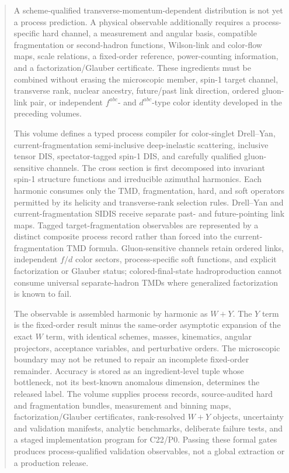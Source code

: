 \documentclass[11pt]{article}
\begin{document}
\begin{abstract}
A scheme-qualified transverse-momentum-dependent distribution is not yet a process prediction.  A physical observable additionally requires a process-specific hard channel, a measurement and angular basis, compatible fragmentation or second-hadron functions, Wilson-link and color-flow maps, scale relations, a fixed-order reference, power-counting information, and a factorization/Glauber certificate.  These ingredients must be combined without erasing the microscopic member, spin-1 target channel, transverse rank, nuclear ancestry, future/past link direction, ordered gluon-link pair, or independent \(f^{abc}\)- and \(d^{abc}\)-type color identity developed in the preceding volumes.

This volume defines a typed process compiler for color-singlet Drell--Yan, current-fragmentation semi-inclusive deep-inelastic scattering, inclusive tensor DIS, spectator-tagged spin-1 DIS, and carefully qualified gluon-sensitive channels.  The cross section is first decomposed into invariant spin-1 structure functions and irreducible azimuthal harmonics.  Each harmonic consumes only the TMD, fragmentation, hard, and soft operators permitted by its helicity and transverse-rank selection rules.  Drell--Yan and current-fragmentation SIDIS receive separate past- and future-pointing link maps.  Tagged target-fragmentation observables are represented by a distinct composite process record rather than forced into the current-fragmentation TMD formula.  Gluon-sensitive channels retain ordered links, independent \(f/d\) color sectors, process-specific soft functions, and explicit factorization or Glauber status; colored-final-state hadroproduction cannot consume universal separate-hadron TMDs where generalized factorization is known to fail.

The observable is assembled harmonic by harmonic as \(W+Y\).  The \(Y\) term is the fixed-order result minus the same-order asymptotic expansion of the exact \(W\) term, with identical schemes, masses, kinematics, angular projectors, acceptance variables, and perturbative orders.  The microscopic boundary may not be retuned to repair an incomplete fixed-order remainder.  Accuracy is stored as an ingredient-level tuple whose bottleneck, not its best-known anomalous dimension, determines the released label.  The volume supplies process records, source-audited hard and fragmentation bundles, measurement and binning maps, factorization/Glauber certificates, rank-resolved \(W+Y\) objects, uncertainty and validation manifests, analytic benchmarks, deliberate failure tests, and a staged implementation program for C22/P0.  Passing these formal gates produces process-qualified validation observables, not a global extraction or a production release.
\end{abstract}
\end{document}
